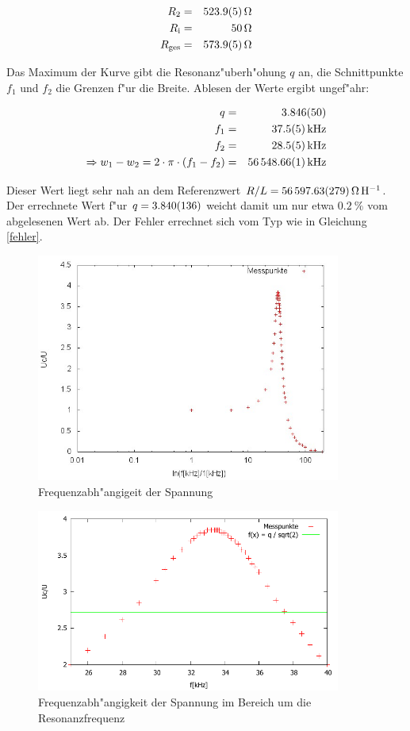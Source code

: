 	\begin{eqnarray*}
		R_\mathrm{2} &=& \SI{523.9 (5)}{\ohm}\\
		R_\mathrm{i} &=& \SI{50}{\ohm}\\
		R_\mathrm{ges} &=& \SI{573.9 (5)}{\ohm}
	\end{eqnarray*}

	Das Maximum der Kurve gibt die Resonanz"uberh"ohung $q$ an, die Schnittpunkte $f_1$ und $f_2$ die Grenzen f"ur die Breite.
	Ablesen der Werte ergibt ungef"ahr:

	\begin{eqnarray*}
		q &=& \SI{3.846 (50)}{}\\
		f_1 &=& \SI{37.5 (5)}{\kilo\hertz}\\
		f_2 &=& \SI{28.5 (5)}{\kilo\hertz}\\
		\Rightarrow w_1 - w_2 = 2 \cdot \pi \cdot (f_1 - f_2) &=& \SI{56548.66 (1)}{\kilo\hertz}\\
	\end{eqnarray*}

	Dieser Wert liegt sehr nah an dem Referenzwert $R/L = \SI{56597.63 (279)}{\ohm \per \henry}$.
	Der errechnete Wert f"ur $q = \SI{3.840 (136)}{}$ weicht damit um nur etwa $\SI{0.2}{\%}$ vom abgelesenen Wert ab.
	Der Fehler errechnet sich vom Typ wie in Gleichung \eqref{fehler}.

	\clearpage
	

	\begin{figure}[!h]
		\centering
		\includegraphics[width = 10cm]{img/graph_c.jpg}
		\caption{Frequenzabh"angigeit der Spannung}
		\label{frequenz_1}
	\end{figure}

	\begin{figure}[!h]
		\centering
		\includegraphics[width = 10cm]{img/graph_c.pdf}
		\caption{Frequenzabh"angigkeit der Spannung im Bereich um die Resonanzfrequenz}
		\label{frequenz_2}
	\end{figure}

